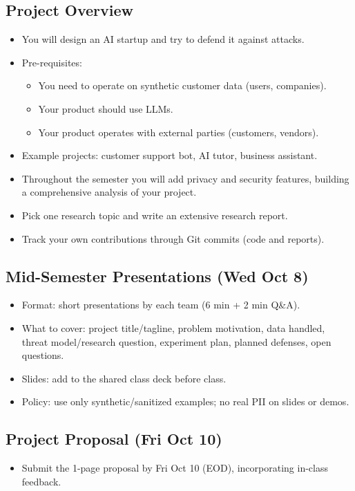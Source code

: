 \documentclass[11pt]{article}
\begin{document}
\subsection*{Project Overview}
\begin{itemize}
  \item You will design an AI startup and try to defend it against attacks.
  \item Pre-requisites:
  \begin{itemize}
    \item You need to operate on synthetic customer data (users, companies).
    \item Your product should use LLMs.
    \item Your product operates with external parties (customers, vendors).
  \end{itemize}
  \item Example projects: customer support bot, AI tutor, business assistant.
  \item Throughout the semester you will add privacy and security features, building a comprehensive analysis of your project.
  \item Pick one research topic and write an extensive research report.
  \item Track your own contributions through Git commits (code and reports).
\end{itemize}

\subsection*{Mid-Semester Presentations (Wed Oct 8)}
\begin{itemize}
  \item Format: short presentations by each team (6 min + 2 min Q\&A).
  \item What to cover: project title/tagline, problem motivation, data handled, threat model/research question, experiment plan, planned defenses, open questions.
  \item Slides: add to the shared class deck before class.
  \item Policy: use only synthetic/sanitized examples; no real PII on slides or demos.
\end{itemize}

\subsection*{Project Proposal (Fri Oct 10)}
\begin{itemize}
  \item Submit the 1-page proposal by Fri Oct 10 (EOD), incorporating in-class feedback.
\end{itemize}
\end{document}
